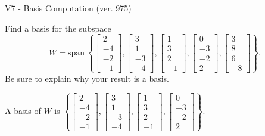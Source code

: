 \begin{exercise}
  \begin{exerciseTitle}V7 - Basis Computation (ver. 975)\end{exerciseTitle}
  \begin{exerciseStatement}
    Find a basis for the subspace 
\[W=\mathrm{span}\ \left\{\left[\begin{array}{r}
2 \\
-4 \\
-2 \\
-1
\end{array}\right] , \left[\begin{array}{r}
3 \\
1 \\
-3 \\
-4
\end{array}\right] , \left[\begin{array}{r}
1 \\
3 \\
2 \\
-1
\end{array}\right] , \left[\begin{array}{r}
0 \\
-3 \\
-2 \\
2
\end{array}\right] , \left[\begin{array}{r}
3 \\
8 \\
6 \\
-8
\end{array}\right]\right\}.\]
 Be sure to explain why your result is a basis.


  \end{exerciseStatement}
  \begin{exerciseAnswer}
   A basis of \(W\) is  \(\left\{\left[\begin{array}{r}
2 \\
-4 \\
-2 \\
-1
\end{array}\right] , \left[\begin{array}{r}
3 \\
1 \\
-3 \\
-4
\end{array}\right] , \left[\begin{array}{r}
1 \\
3 \\
2 \\
-1
\end{array}\right] , \left[\begin{array}{r}
0 \\
-3 \\
-2 \\
2
\end{array}\right]\right\}\).
  


  \end{exerciseAnswer}
\end{exercise}